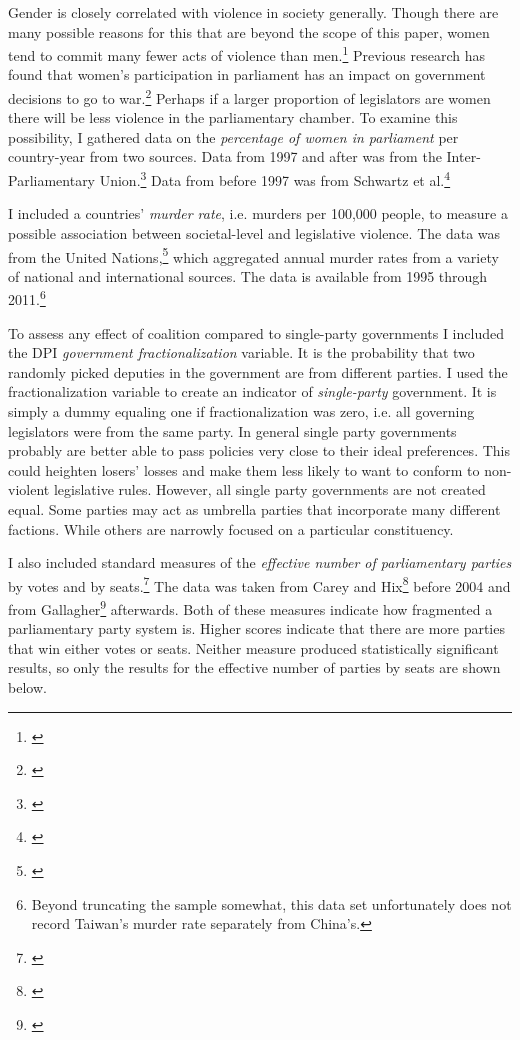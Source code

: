\documentclass[a4paper]{article}\usepackage[]{graphicx}\usepackage[]{color}
\begin{document}
Gender is closely correlated with violence in society generally. Though there are many possible reasons for this that are beyond the scope of this paper, women tend to commit many fewer acts of violence than men.\footnote{\citealt{Schwartz2009}} Previous research has found that women's participation in parliament has an impact on government decisions to go to war.\footnote{\citealt{Melander2005}} Perhaps if a larger proportion of legislators are women there will be less violence in the parliamentary chamber. To examine this possibility, I gathered data on the \emph{percentage of women in parliament} per country-year from two sources. Data from 1997 and after was from the Inter-Parliamentary Union.\footnote{\citealt{IPU2013}} Data from before 1997 was from Schwartz et al.\footnote{\citealt{Schwartz2009}}

I included a countries' \emph{murder rate}, i.e. murders per 100,000 people, to measure a possible association between societal-level and legislative violence. The data was from the United Nations,\footnote{\citealt{UNMurder2013}} which aggregated annual murder rates from a variety of national and international sources. The data is available from 1995 through 2011.\footnote{Beyond truncating the sample somewhat, this data set unfortunately does not record Taiwan's murder rate separately from China's.}

To assess any effect of coalition compared to single-party governments I included the DPI {\emph{government fractionalization}} variable. It is the probability that two randomly picked deputies in the government are from different parties. I used the fractionalization variable to create an indicator of {\emph{single-party}} government. It is simply a dummy equaling one if fractionalization was zero, i.e. all governing legislators were from the same party. In general single party governments probably are better able to pass policies very close to their ideal preferences. This could heighten losers' losses and make them less likely to want to conform to non-violent legislative rules. However, all single party governments are not created equal. Some parties may act as umbrella parties that incorporate many different factions. While others are narrowly focused on a particular constituency. 

I also included standard measures of the \emph{effective number of parliamentary parties} by votes and by seats.\footnote{\citealt{Laakso1979, Taagepera1989}} The data was taken from Carey and Hix\footnote{\citealt{Carey2011}} before 2004 and from Gallagher\footnote{\citealt{Gallagher2012}} afterwards. Both of these measures indicate how fragmented a parliamentary party system is. Higher scores indicate that there are more parties that win either votes or seats. Neither measure produced statistically significant results, so only the results for the effective number of parties by seats are shown below.
\end{document}
